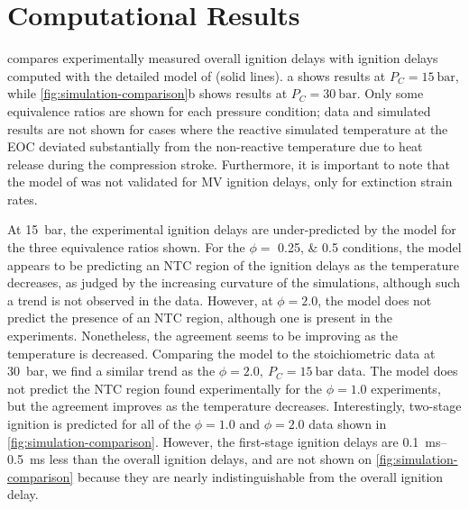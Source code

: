 \documentclass[letterpaper, review, sort&compress]{elsarticle}
\begin{document}
\section{Computational Results}\label{sec:computational-results}

 compares experimentally measured overall ignition delays with
ignition delays computed with the detailed model of \citet{Dievart2013} (solid lines).
a shows results at \(P_C = \SI{15}{\bar}\), while
\cref{fig:simulation-comparison}b shows results at \(P_C = \SI{30}{\bar}\). Only some equivalence
ratios are shown for each pressure condition; data and simulated results are not shown for cases
where the reactive simulated temperature at the EOC deviated substantially from the non-reactive
temperature due to heat release during the compression stroke. Furthermore, it is important to note
that the model of \citet{Dievart2013} was not validated for MV ignition delays, only for extinction
strain rates.

\begin{center}
    \captionsetup{type=figure}
    \resizebox{\textwidth}{!}{}
    \caption{Comparison of experimental and simulated ignition delays computed using the procedure
    described in \cref{sec:experimental-modeling}. a) \SI{15}{\bar}, b) \SI{30}{\bar}.}
    \label{fig:simulation-comparison}
\end{center}

At \SI{15}{\bar}, the experimental ignition delays are under-predicted by the \citet{Dievart2013}
model for the three equivalence ratios shown. For the \(\phi =\) \numlist{0.25;0.5} conditions, the
model appears to be predicting an NTC region of the ignition delays as the temperature decreases, as
judged by the increasing curvature of the simulations, although such a trend is not observed in the
data. However, at \(\phi = 2.0\), the model does not predict the presence of an NTC region, although
one is present in the experiments. Nonetheless, the agreement seems to be improving as the
temperature is decreased. Comparing the \citet{Dievart2013} model to the stoichiometric data at
\SI{30}{\bar}, we find a similar trend as the \(\phi=2.0,\ P_C=\SI{15}{\bar}\) data. The model does
not predict the NTC region found experimentally for the \(\phi = 1.0\) experiments, but the
agreement improves as the temperature decreases. Interestingly, two-stage ignition is predicted for
all of the \(\phi=1.0\) and \(\phi=2.0\) data shown in \cref{fig:simulation-comparison}. However,
the first-stage ignition delays are \SIrange{0.1}{0.5}{\ms} less than the overall ignition delays,
and are not shown on \cref{fig:simulation-comparison} because they are nearly indistinguishable from
the overall ignition delay.
\end{document}
